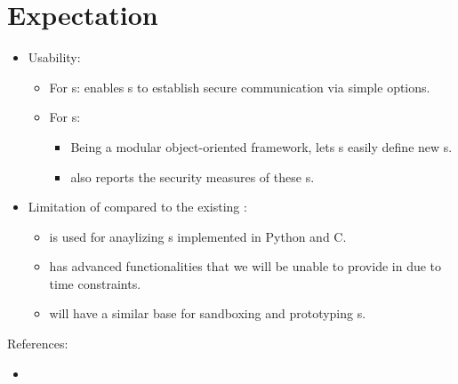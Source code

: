 
\section{Expectation}

\begin{itemize}
\item Usability:
  \begin{itemize}
  \item For \eu s: \cry{} enables \eu s to establish
    secure communication via simple \cl{} options.
  \item For \cg s:
    \begin{itemize}
    \item Being a modular object-oriented framework,
      \cry{} lets \cg s easily define new \cs s.
    \item \cry{} also reports the security measures
      of these \cs s.
    \end{itemize}
\end{itemize}
\item Limitation of \cry{} compared to
  the existing \charm{} \cf:
  \begin{itemize}
  \item \charm{} is used for anaylizing \cs s
    implemented in Python and C.
  \item \charm{} has advanced functionalities
    that we will be unable to provide in \cry{}
    due to time constraints.
  \item \cry{} will have a similar base for sandboxing
    and prototyping \cs s.
  \end{itemize}
\end{itemize}


References:
\begin{itemize}
\item \cite{charm}
\end{itemize}
